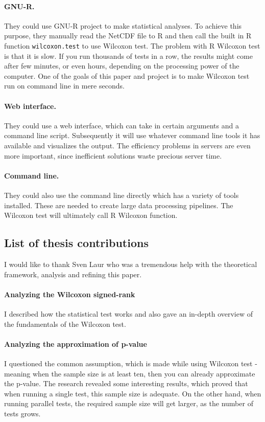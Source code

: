 \documentclass[12pt]{article}
\begin{document}
{\paragraph{GNU-R.}
They could use GNU-R project to make statistical analyses. To achieve this purpose, they manually read the NetCDF file to R and then call the built in R function \texttt{wilcoxon.test} to use Wilcoxon test. The problem with R Wilcoxon test is that it is slow. If you run thousands of tests in a row, the results might come after few minutes, or even hours, depending on the processing power of the computer. One of the goals of this paper and project is to make Wilcoxon test run on command line in mere seconds.
\paragraph{Web interface.}
They could use a web interface, which can take in certain arguments and a command line script. Subsequently it will use whatever command line tools it has available and visualizes the output. The efficiency problems in servers are even more important, since inefficient solutions waste precious server time.

\paragraph{Command line.}
They could also use the command line directly which has a variety of tools installed. These are needed to create large data processing pipelines. The Wilcoxon test will ultimately call R Wilcoxon function.

\subsection{List of thesis contributions}

I would like to thank Sven Laur who was a tremendous help with the theoretical framework, analysis and refining this paper.

\paragraph{Analyzing the Wilcoxon signed-rank\\}
I described how the statistical test works and also gave an in-depth overview of the fundamentals of the Wilcoxon test.

\paragraph{Analyzing the approximation of p-value\\}
I questioned the common assumption, which is made while using Wilcoxon test - meaning when the sample size is at least ten, then you can already approximate the p-value. The research revealed some interesting results, which proved that when running a single test, this sample size is adequate. On the other hand, when running parallel tests, the required sample size will get larger, as the number of tests grows.

}
\end{document}
